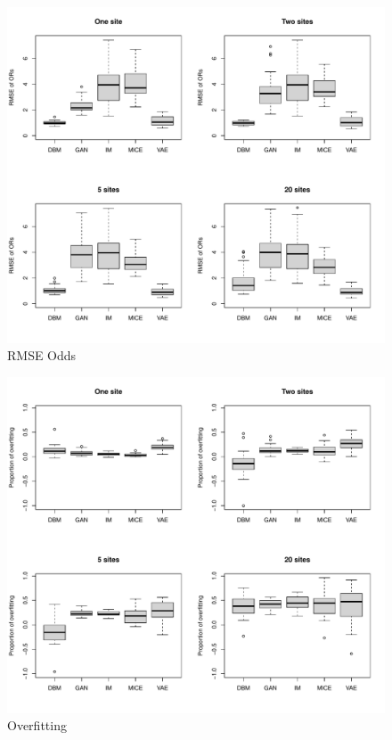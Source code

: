 \documentclass[12pt]{article}
\begin{document}
 \begin{figure}[h]
   \centering
   \includegraphics[scale=0.7]{images/rmseodds.pdf}
   \caption{RMSE Odds}
 \end{figure}
 
  \begin{figure}[h]
   \centering
   \includegraphics[scale=0.7]{images/overfitting.pdf}
   \caption{Overfitting}
 \end{figure}
\end{document}
